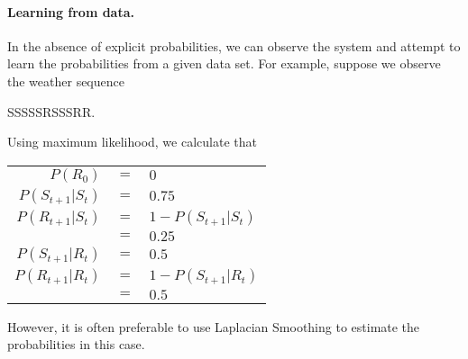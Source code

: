\documentclass[10pt,a4paper]{article}
\begin{document}
\paragraph{Learning from data.} In the absence of explicit probabilities, we can observe the system and attempt to learn the probabilities from a given data set. For example, suppose we observe the weather sequence
\begin{center}
SSSSSRSSSRR.
\end{center}
Using maximum likelihood, we calculate that
\begin{center}
\begin{tabular}{r@{} @{ }c@{ } @{}l}
$P(R_0)$ & $=$ & $0$ \\
$P(S_{t+1}|S_t)$ & $=$ & $0.75$ \\
$P(R_{t+1}|S_t)$ & $=$ & $1 - P(S_{t+1}|S_t)$ \\
& $=$ & $0.25$ \\
$P(S_{t+1}|R_t)$ & $=$ & $0.5$ \\
$P(R_{t+1}|R_t)$ & $=$ & $1 - P(S_{t+1}|R_t)$ \\
& $=$ & $0.5$ \\
\end{tabular}
\end{center}
However, it is often preferable to use Laplacian Smoothing to estimate the probabilities in this case.
\end{document}
